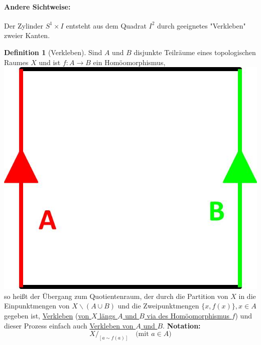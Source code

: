 \documentclass[a4paper,11pt,notitlepage]{report}
\theoremstyle{remark}
\theoremstyle{definition}
\newtheorem{definition}{Definition}[chapter]
\begin{document}
\paragraph{Andere Sichtweise:}
Der Zylinder $S^1 \times I$ entsteht aus dem Quadrat $I^2$ durch geeignetes "Verkleben" zweier Kanten. 

\begin{definition}[Verkleben]
Sind $A$ und $B$ disjunkte Teilräume eines topologischen Raumes $X$ und ist $f \colon A \rightarrow B$ ein Homöomorphismus, \includegraphics[scale=0.2]{images/Def_Verkleben.jpg} so heißt der Übergang zum Quotientenraum, der durch die Partition von $X$ in die Einpunktmengen von $X \backslash (A \cup B)$ und die Zweipunktmengen $\{x,f(x)\}, x \in A$ gegeben ist, \underline{Verkleben} (\underline{von $X$ längs $A$ und $B$ via des Homöomorphismus $f$}) und dieser Prozess einfach auch \underline{Verkleben von $A$ und $B$}.
\newline
\textbf{Notation:}
$$X/_{[a \sim f(a)]} \quad \text{(mit $a \in A$)}$$
\end{definition}
\end{document}
